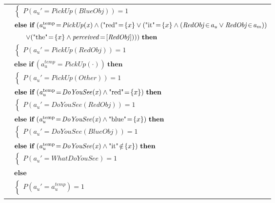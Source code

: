 \begin{footnotesize}
\begin{longtable}{p{1cm}l}
& \;\;\;\;\; $ \begin{cases}P(\mathit{a_u}'\!=\!\mathit{PickUp(BlueObj)})\!=\!1 \end{cases}$ \vspace{1mm} \\ & $ \textbf{else if} \ (\mathit{a_u^{\text{temp}}}\!=\!\mathit{PickUp({x})} \land (\text{"red"}\!=\!\mathit\{x\} \lor (\text{"it"}\!=\!\mathit\{x\} \land (\mathit{RedObj}\!\in\!\mathit{a_u} \lor \mathit{RedObj}\!\in\!\mathit{a_m})) $ \\ & $\ \ \ \ \  \lor (\text{"the"}\!=\!\mathit\{x\} \land \mathit{perceived}\!=\![\mathit{RedObj}]))) \ \textbf{then}$ \\
& \;\;\;\;\; $ \begin{cases}P(\mathit{a_u}'\!=\!\mathit{PickUp(RedObj)})\!=\!1 \end{cases}$ \vspace{1mm} \\ & $ \textbf{else if} \ (\mathit{a_u^{\text{temp}}}\!=\!\mathit{PickUp(\cdot)}) \ \textbf{then}$ \\
& \;\;\;\;\; $ \begin{cases}P(\mathit{a_u}'\!=\!\mathit{PickUp(Other)})\!=\!1 \end{cases}$ \vspace{1mm} \\ & $ \textbf{else if} \ (\mathit{a_u^{\text{temp}}}\!=\!\mathit{DoYouSee({x})} \land \text{"red"}\!=\!\mathit\{x\}) \ \textbf{then}$ \\
& \;\;\;\;\; $ \begin{cases}P(\mathit{a_u}'\!=\!\mathit{DoYouSee(RedObj)})\!=\!1 \end{cases}$ \vspace{1mm} \\ & $ \textbf{else if} \ (\mathit{a_u^{\text{temp}}}\!=\!\mathit{DoYouSee({x})} \land \text{"blue"}\!=\!\mathit\{x\}) \ \textbf{then}$ \\
& \;\;\;\;\; $ \begin{cases}P(\mathit{a_u}'\!=\!\mathit{DoYouSee(BlueObj)})\!=\!1 \end{cases}$ \vspace{1mm} \\ & $ \textbf{else if} \ (\mathit{a_u^{\text{temp}}}\!=\!\mathit{DoYouSee({x})} \land \text{"it"}\!\notin\!\mathit\{x\}) \ \textbf{then}$ \\
& \;\;\;\;\; $ \begin{cases}P(\mathit{a_u}'\!=\!\mathit{WhatDoYouSee})\!=\!1 \end{cases}$ \vspace{1mm} \\ & $ \textbf{else}$ \\
& \;\;\;\;\; $ \begin{cases}P(\mathit{a_u}'\!=\!\mathit{{a_u^{\text{temp}}}})\!=\!1 \end{cases}$ \\ \\[-1mm]
\end{longtable}
\end{footnotesize}

